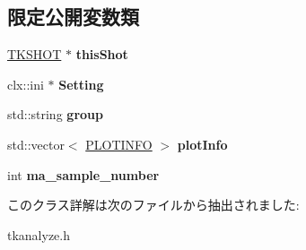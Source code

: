 \subsection*{限定公開変数類}
\begin{DoxyCompactItemize}
\item 
\mbox{\label{class_t_k_a_n_a_l_y_z_e_a9413390f419657d838a950ad91198b2d}} 
\hyperlink{class_t_k_s_h_o_t}{T\+K\+S\+H\+OT} $\ast$ {\bfseries this\+Shot}
\item 
\mbox{\label{class_t_k_a_n_a_l_y_z_e_a8ef97d5dda7259043e08c5d80dc321d0}} 
clx\+::ini $\ast$ {\bfseries Setting}
\item 
\mbox{\label{class_t_k_a_n_a_l_y_z_e_affe19e7048a316ab493835883d9d5568}} 
std\+::string {\bfseries group}
\item 
\mbox{\label{class_t_k_a_n_a_l_y_z_e_a15230e395923bdafd1b2ad44a931be02}} 
std\+::vector$<$ \hyperlink{class_t_k_p_l_o_t_1_1_p_l_o_t_i_n_f_o}{P\+L\+O\+T\+I\+N\+FO} $>$ {\bfseries plot\+Info}
\item 
\mbox{\label{class_t_k_a_n_a_l_y_z_e_a7fd597ef5634b9ca6a346e305a0c1c23}} 
int {\bfseries ma\+\_\+sample\+\_\+number}
\end{DoxyCompactItemize}


このクラス詳解は次のファイルから抽出されました\+:\begin{DoxyCompactItemize}
\item 
tkanalyze.\+h\end{DoxyCompactItemize}
